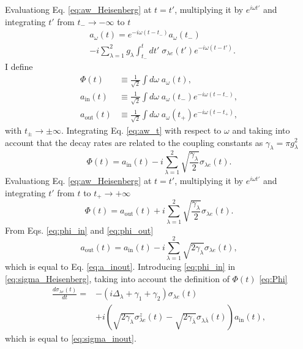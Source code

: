 \documentclass[aps,pra,reprint,amsmath,amssymb]{revtex4-1}
\begin{document}
Evaluationg Eq. \eqref{eq:aw_Heisenberg} at $t=t'$, multiplying it by $e^{i\omega t'}$ and integrating $t'$ from $t_-\to -\infty$ to $t$
\begin{align}\label{eq:aw_t}
&a_\omega(t)=e^{-i\omega(t-t_-)} a_\omega(t_-)\nonumber\\
& - i\sum_{\lambda=1}^2 g_\lambda \int_{t_-}^t dt'\; \sigma_{\lambda e}(t')e^{-i\omega(t-t')}.
\end{align}
I define
\begin{align}
\label{eq:Phi}\Phi(t) & \equiv \frac{1}{\sqrt{2}}\int d\omega\; a_\omega (t),\\
a_\text{in}(t) & \equiv \frac{1}{\sqrt{2}}\int d\omega\; a_\omega(t_-) e^{-i\omega(t-t_-)},\\
a_\text{out}(t) & \equiv \frac{1}{\sqrt{2}}\int d\omega\; a_\omega(t_+) e^{-i\omega(t-t_+)},
\end{align}
with $t_\pm\to \pm\infty$. Integrating Eq. \eqref{eq:aw_t} with respect to $\omega$ and taking into account that the decay rates are related to the coupling constants as $\gamma_\lambda=\pi g_\lambda^2$
\begin{equation}\label{eq:phi_in}
\Phi(t)=a_\text{in}(t)-i\sum_{\lambda=1}^2\sqrt{\frac{\gamma_\lambda}{2}} \sigma_{\lambda e}(t).
\end{equation}
Evaluationg Eq. \eqref{eq:aw_Heisenberg} at $t=t'$, multiplying it by $e^{i\omega t'}$ and integrating $t'$ from $t$ to $t_+\to +\infty$
\begin{equation}\label{eq:phi_out}
\Phi(t)=a_\text{out}(t)+i\sum_{\lambda=1}^2\sqrt{\frac{\gamma_\lambda}{2}} \sigma_{\lambda e}(t).
\end{equation}
From Eqs. \eqref{eq:phi_in} and \eqref{eq:phi_out}
\begin{equation}
a_\text{out}(t)=a_\text{in}(t)-i\sum_{\lambda=1}^2 \sqrt{2\gamma_\lambda} \sigma_{\lambda e}(t),
\end{equation}
which is equal to Eq. \eqref{eq:a_inout}. Introducing \eqref{eq:phi_in} in \eqref{eq:sigma_Heisenberg}, taking into account the definition of $\Phi(t)$ \eqref{eq:Phi}
\begin{align}
\frac{d\sigma_{\lambda e}(t)}{dt}=&-(i\Delta_\lambda +\gamma_1+\gamma_2)\sigma_{\lambda e}(t)\nonumber\\
&+i(\sqrt{2\gamma_\lambda} \sigma_{\lambda e}^z(t) - \sqrt{2\gamma_{\overline{\lambda}}}\sigma_{\lambda\overline{\lambda}}(t))a_\text{in}(t),
\end{align} 
which is equal to \eqref{eq:sigma_inout}.
\end{document}
